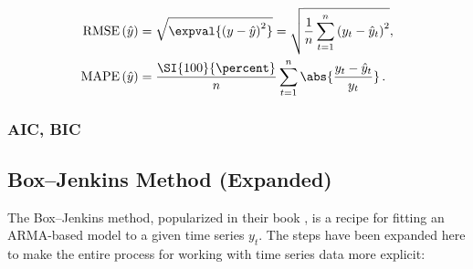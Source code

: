 \begin{subequations}\label{eq:time_series:RMSE_MAPE}
\begin{align}
\text{RMSE}\left(\hat{y}\right) &= \sqrt{\expval{\left(y - \hat{y}\right)^{2}}} = \sqrt{\frac{1}{n}\sum_{t=1}^{n} \left(y_{t} - \hat{y}_{t}\right)^{2}}, \label{eq:time_series:RMSE} \\
\text{MAPE}\left(\hat{y}\right) &= \frac{\SI{100}{\percent}}{n} \sum_{t=1}^{n} \abs{\frac{y_{t} - \hat{y}_{t}}{y_{t}}}\,. \label{eq:time_series:MAPE}
\end{align}
\end{subequations}

\subsubsection{AIC, BIC}
\label{additional:time_series:AIC_BIC}


\subsection{Box--Jenkins Method (Expanded)}
\label{additional:time_series:box_jenkins}

The Box--Jenkins method, popularized in their book \cite{boxjen76},
is a recipe for fitting an ARMA-based model to a given time series $y_{t}$.
The steps have been expanded here to make the entire process
for working with time series data more explicit:

